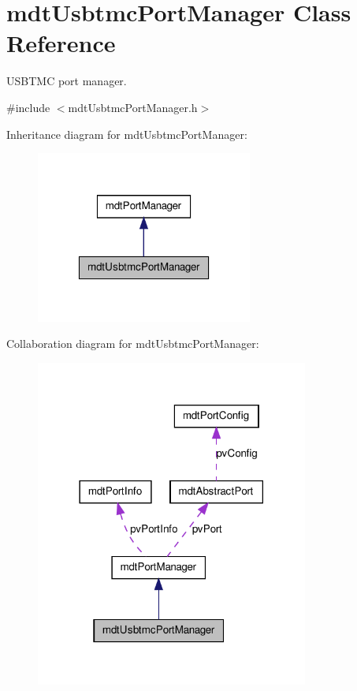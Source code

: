 \hypertarget{classmdt_usbtmc_port_manager}{
\section{mdtUsbtmcPortManager Class Reference}
\label{classmdt_usbtmc_port_manager}
}


USBTMC port manager.  




{\ttfamily \#include $<$mdtUsbtmcPortManager.h$>$}



Inheritance diagram for mdtUsbtmcPortManager:\nopagebreak
\begin{figure}[H]
\begin{center}
\leavevmode
\includegraphics[width=202pt]{classmdt_usbtmc_port_manager__inherit__graph}
\end{center}
\end{figure}


Collaboration diagram for mdtUsbtmcPortManager:
\nopagebreak
\begin{figure}[H]
\begin{center}
\leavevmode
\includegraphics[width=254pt]{classmdt_usbtmc_port_manager__coll__graph}
\end{center}
\end{figure}
